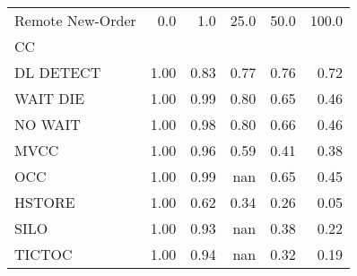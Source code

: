 \begin{tabular}{lrrrrr}
\toprule
Remote New-Order &  0.0   &  1.0   &  25.0  &  50.0  &  100.0 \\
CC        &        &        &        &        &        \\
\midrule
DL DETECT &   1.00 &   0.83 &   0.77 &   0.76 &   0.72 \\
WAIT DIE  &   1.00 &   0.99 &   0.80 &   0.65 &   0.46 \\
NO WAIT   &   1.00 &   0.98 &   0.80 &   0.66 &   0.46 \\
MVCC      &   1.00 &   0.96 &   0.59 &   0.41 &   0.38 \\
OCC       &   1.00 &   0.99 &    nan &   0.65 &   0.45 \\
HSTORE    &   1.00 &   0.62 &   0.34 &   0.26 &   0.05 \\
SILO      &   1.00 &   0.93 &    nan &   0.38 &   0.22 \\
TICTOC    &   1.00 &   0.94 &    nan &   0.32 &   0.19 \\
\bottomrule
\end{tabular}
